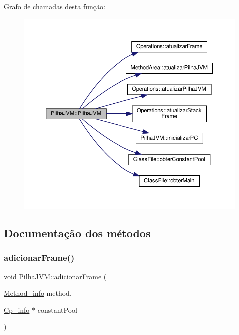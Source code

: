 Grafo de chamadas desta função\+:\nopagebreak
\begin{figure}[H]
\begin{center}
\leavevmode
\includegraphics[width=350pt]{classPilhaJVM_a9acc6081073376a6f658c9dcfd3f6011_cgraph}
\end{center}
\end{figure}


\subsection{Documentação dos métodos}
\mbox{\label{classPilhaJVM_a9add990f9c258d39d2fcd791398c96ac}} 
\subsubsection{\texorpdfstring{adicionar\+Frame()}{adicionarFrame()}\hspace{0.1cm}{\footnotesize\ttfamily [1/2]}}
{\footnotesize\ttfamily void Pilha\+J\+V\+M\+::adicionar\+Frame (\begin{DoxyParamCaption}\item[{\hyperlink{structMethod__info}{Method\+\_\+info}}]{method,  }\item[{\hyperlink{structCp__info}{Cp\+\_\+info} $\ast$}]{constant\+Pool }\end{DoxyParamCaption})}



